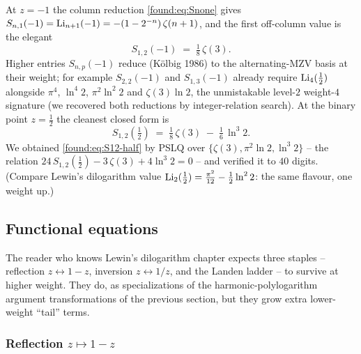 At $z=-1$ the column reduction \eqref{found:eq:Snone} gives $S_{n,1}(-1)=\operatorname{Li}_{n+1}(-1)=-(1-2^{-n})\,\zeta(n+1)$, and the first off-column value is the elegant
\begin{equation}\label{found:eq:S12-minus}
  S_{1,2}(-1)\;=\;\tfrac18\,\zeta(3).
\end{equation}
Higher entries $S_{n,p}(-1)$ reduce (Kölbig 1986) to the alternating-MZV basis at their weight; for example $S_{2,2}(-1)$ and $S_{1,3}(-1)$ already require $\operatorname{Li}_4(\tfrac12)$ alongside $\pi^4$, $\ln^4 2$, $\pi^2\ln^2 2$ and $\zeta(3)\ln 2$, the unmistakable level-$2$ weight-$4$ signature (we recovered both reductions by integer-relation search). At the binary point $z=\tfrac12$ the cleanest closed form is
\begin{equation}\label{found:eq:S12-half}
  \boxed{\;S_{1,2}\!\left(\tfrac12\right)\;=\;\tfrac18\,\zeta(3)\;-\;\tfrac16\,\ln^{3}2.\;}
\end{equation}
We obtained \eqref{found:eq:S12-half} by PSLQ over $\{\zeta(3),\pi^2\ln 2,\ln^3 2\}$ -- the relation $24\,S_{1,2}(\tfrac12)-3\,\zeta(3)+4\ln^3 2=0$ -- and verified it to $40$ digits. (Compare Lewin's dilogarithm value $\operatorname{Li}_2(\tfrac12)=\tfrac{\pi^2}{12}-\tfrac12\ln^2 2$: the same flavour, one weight up.)

\subsection{Functional equations}

The reader who knows Lewin's dilogarithm chapter expects three staples -- reflection $z\leftrightarrow 1-z$, inversion $z\leftrightarrow 1/z$, and the Landen ladder -- to survive at higher weight. They do, as specializations of the harmonic-polylogarithm argument transformations of the previous section, but they grow extra lower-weight ``tail'' terms.

\subsubsection*{Reflection $z\mapsto 1-z$}

